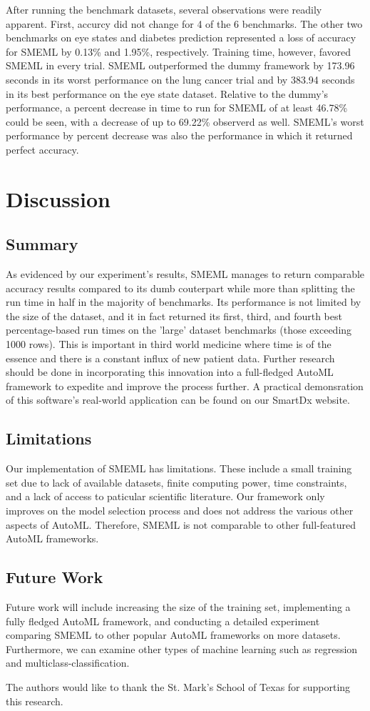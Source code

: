 \documentclass{article}
\begin{document}
After running the benchmark datasets, several observations were readily apparent. First, accurcy did not change for 4 of the 6 benchmarks. The other two benchmarks on eye states and diabetes prediction represented a loss of accuracy for SMEML by 0.13\% and 1.95\%, respectively. Training time, however, favored SMEML in every trial. SMEML outperformed the dummy framework by 173.96 seconds in its worst performance on the lung cancer trial and by 383.94 seconds in its best performance on the eye state dataset. Relative to the dummy's performance, a percent decrease in time to run for SMEML of at least 46.78\% could be seen, with a decrease of up to 69.22\% observerd as well. SMEML's worst performance by percent decrease was also the performance in which it returned perfect accuracy. 
\section{Discussion}
\subsection{Summary}
As evidenced by our experiment's results, SMEML manages to return comparable accuracy results compared to its dumb couterpart while more than splitting the run time in half in the majority of benchmarks. Its performance is not limited by the size of the dataset, and it in fact returned its first, third, and fourth best percentage-based run times on the 'large' dataset benchmarks (those exceeding 1000 rows). This is important in third world medicine where time is of the essence and there is a constant influx of new patient data. Further research should be done in incorporating this innovation into a full-fledged AutoML framework to expedite and improve the process further. A practical demonsration of this software's real-world application can be found on our SmartDx website. 
\subsection{Limitations}
Our implementation of SMEML has limitations. These include a small training set due to lack of available datasets, finite computing power, time constraints, and a lack of access to paticular scientific literature. Our framework only improves on the model selection process and does not address the various other aspects of AutoML. Therefore, SMEML is not comparable to other full-featured AutoML frameworks.
\subsection{Future Work}
Future work will include increasing the size of the training set, implementing a fully fledged AutoML framework, and conducting a detailed experiment comparing SMEML to other popular AutoML frameworks on more datasets. Furthermore, we can examine other types of machine learning such as regression and multiclass-classification.
\begin{ack}
The authors would like to thank the St. Mark's School of Texas for supporting this research.
\end{ack}
\end{document}
